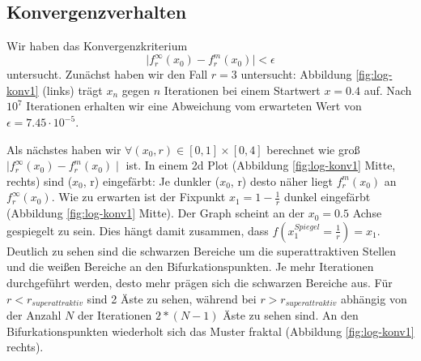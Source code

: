 \documentclass[12pt,a4paper]{article}
\begin{document}
\subsection{Konvergenzverhalten}
Wir haben das Konvergenzkriterium 
\begin{equation}
\mid f^{\infty}_r(x_0)-f^{m}_r(x_0)\mid < \epsilon
\end{equation}
untersucht. 
Zunächst haben wir den Fall $r=3$ untersucht: Abbildung \ref{fig:log-konv1} (links) trägt $x_n$ gegen $n$ Iterationen bei einem Startwert $x=0.4$ auf. Nach $10^7$ Iterationen erhalten wir eine Abweichung vom erwarteten Wert von $\epsilon=7.45 \cdot 10^{-5}$.


Als nächstes haben wir $\forall (x_0, r) \in [0,1] \times [0,4]$  berechnet wie groß $\mid f^{\infty}_r(x_0)-f^{m}_r(x_0)\mid $ ist. 
In einem 2d Plot (Abbildung \ref{fig:log-konv1} Mitte, rechts) sind ($x_0$, r) eingefärbt: Je dunkler ($x_0$, r) desto näher liegt $f^{m}_r(x_0)$ an $f^{\infty}_r(x_0)$. 
Wie zu erwarten ist der Fixpunkt $x_1=1-\frac{1}{r}$ dunkel eingefärbt (Abbildung \ref{fig:log-konv1} Mitte). Der Graph scheint an der $x_0=0.5$ Achse gespiegelt zu sein. Dies hängt damit zusammen, dass $f(x^{Spiegel}_{1}=\frac{1}{r}) = x_1$. 
Deutlich zu sehen sind die schwarzen Bereiche um die superattraktiven Stellen und die weißen Bereiche an den Bifurkationspunkten. Je mehr Iterationen durchgeführt werden, desto mehr prägen sich die schwarzen Bereiche aus. Für $r < r_{superattraktiv}$ sind 2 Äste zu sehen, während bei $r > r_{superattraktiv}$ abhängig von der Anzahl $N$ der Iterationen $2*(N-1)$ Äste zu sehen sind. An den Bifurkationspunkten wiederholt sich das Muster fraktal (Abbildung \ref{fig:log-konv1} rechts). 
\end{document}

